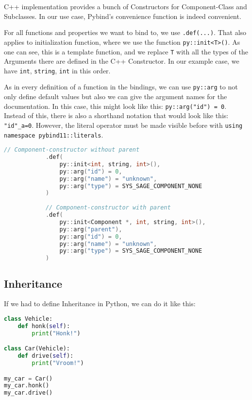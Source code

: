 C++ implementation provides a bunch of Constructors for Component-Class and Subclasses. In our use case, Pybind's convenience function is indeed convenient.

For all functions and properties we want to bind to, we use \verb|.def(...)|. That also applies to initialization function, where we use the function \verb|py::init<T>()|. As one can see, this is a template function, and we replace \verb|T| with all the types of the Arguments there are defined in the C++ Constructor. In our example case, we have \verb|int|, \verb|string|, \verb|int| in this order.

As in every definition of a function in the bindings, we can use \verb|py::arg| to not only define default values but also we can give the argument names for the documentation. In this case, this might look like this: \verb|py::arg("id") = 0|. Instead of this, there is also a shorthand notation that would look like this: \verb|"id"_a=0|. However, the literal operator must be made visible before with \verb|using namespace pybind11::literals|.
\begin{lstlisting}[language=C++, xleftmargin=4em, frame = single]
            // Component-constructor without parent
            .def(
                py::init<int, string, int>(),
                py::arg("id") = 0,
                py::arg("name") = "unknown",
                py::arg("type") = SYS_SAGE_COMPONENT_NONE
            )
            
            // Component-constructor with parent
            .def(
                py::init<Component *, int, string, int>(),
                py::arg("parent"),
                py::arg("id") = 0,
                py::arg("name") = "unknown",
                py::arg("type") = SYS_SAGE_COMPONENT_NONE
            )
\end{lstlisting}
\subsection{Inheritance}

If we had to define Inheritance in Python, we can do it like this:
\newpage
\begin{lstlisting}[language=Python, xleftmargin=4em, frame = single]
class Vehicle:
    def honk(self):
        print("Honk!")

class Car(Vehicle):
    def drive(self):
        print("Vroom!")

my_car = Car()
my_car.honk()
my_car.drive()
\end{lstlisting}

